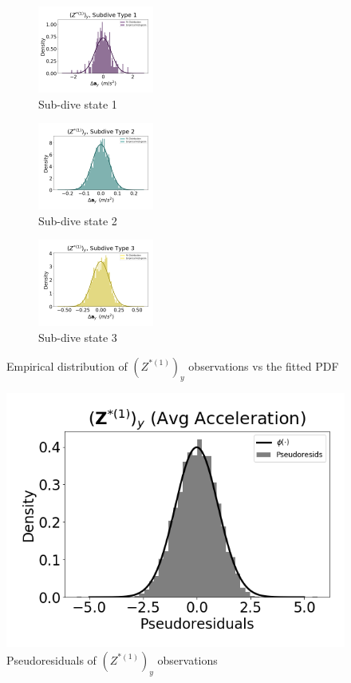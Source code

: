 \documentclass[12pt]{TD-CJS}
\begin{document}

\begin{figure}[ht]
	\centering
	\begin{subfigure}[t]{0.3\textwidth}
        \centering
        \includegraphics[width=1.5in]{../Plots/empirical_hist_Ay_0.png}
        \caption{Sub-dive state 1}
    \end{subfigure}
    \begin{subfigure}[t]{0.3\textwidth}
        \centering
        \includegraphics[width=1.5in]{../Plots/empirical_hist_Ay_1.png}
        \caption{Sub-dive state 2}
    \end{subfigure}
    \begin{subfigure}[t]{0.3\textwidth}
        \centering
        \includegraphics[width=1.5in]{../Plots/empirical_hist_Ay_2.png}
        \caption{Sub-dive state 3}
    \end{subfigure}
    \caption{Empirical distribution of $\left(Z^{*(1)}\right)_y$ observations vs the fitted PDF}
\end{figure}

\begin{figure}
    \centering
    \includegraphics[width=5in]{../Plots/psedoresids_Ay.png}
    \caption{Pseudoresiduals of $\left(Z^{*(1)}\right)_y$ observations}
\end{figure}
\end{document}

